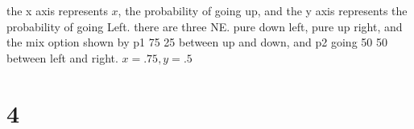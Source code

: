 \documentclass{article}
\begin{document}
\begin{enumerate}
\begin{itemize}
        the x axis represents \(x\), the probability of going up, and the y axis represents the probability of going Left. there are three NE. pure down left, pure up right, and the mix option shown by p1 75 25 between up and down, and p2 going 50 50 between left and right. \(x=.75,y=.5\)

    \end{itemize}
\end{enumerate}











\newpage
\section{4}
\end{document}
